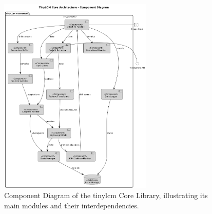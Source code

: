 \begin{figure}[htbp]
    \centering
    \includegraphics[width=0.65\textwidth]{figs/framework/tinylcm-component-dia.png}
    \caption[Component Diagram of the TinyLCM Core Library]{Component Diagram of the \gls{tinylcm} Core Library, illustrating its main modules and their interdependencies.}
    \label{fig:tinylcm_component_diagram}
\end{figure}


